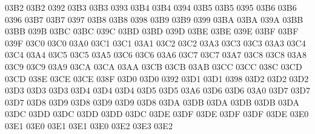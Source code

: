 \setcclcucx 03B2 03B2 0392 %
\setcclcucx 03B3 03B3 0393 %
\setcclcucx 03B4 03B4 0394 %
\setcclcucx 03B5 03B5 0395 %
\setcclcucx 03B6 03B6 0396 %
\setcclcucx 03B7 03B7 0397 %
\setcclcucx 03B8 03B8 0398 %
\setcclcucx 03B9 03B9 0399 %
\setcclcucx 03BA 03BA 039A %
\setcclcucx 03BB 03BB 039B %
\setcclcucx 03BC 03BC 039C %
\setcclcucx 03BD 03BD 039D %
\setcclcucx 03BE 03BE 039E %
\setcclcucx 03BF 03BF 039F %
\setcclcucx 03C0 03C0 03A0 %
\setcclcucx 03C1 03C1 03A1 %
\setcclcucx 03C2 03C2 03A3 %
\setcclcucx 03C3 03C3 03A3 %
\setcclcucx 03C4 03C4 03A4 %
\setcclcucx 03C5 03C5 03A5 %
\setcclcucx 03C6 03C6 03A6 %
\setcclcucx 03C7 03C7 03A7 %
\setcclcucx 03C8 03C8 03A8 %
\setcclcucx 03C9 03C9 03A9 %
\setcclcucx 03CA 03CA 03AA %
\setcclcucx 03CB 03CB 03AB %
\setcclcucx 03CC 03CC 038C %
\setcclcucx 03CD 03CD 038E %
\setcclcucx 03CE 03CE 038F %
\setcclcucx 03D0 03D0 0392 %
\setcclcucx 03D1 03D1 0398 %
\setcclcucx 03D2 03D2 03D2 %
\setcclcucx 03D3 03D3 03D3 %
\setcclcucx 03D4 03D4 03D4 %
\setcclcucx 03D5 03D5 03A6 %
\setcclcucx 03D6 03D6 03A0 %
\setcclcucx 03D7 03D7 03D7 %
\setcclcucx 03D8 03D9 03D8 %
\setcclcucx 03D9 03D9 03D8 %
\setcclcucx 03DA 03DB 03DA %
\setcclcucx 03DB 03DB 03DA %
\setcclcucx 03DC 03DD 03DC %
\setcclcucx 03DD 03DD 03DC %
\setcclcucx 03DE 03DF 03DE %
\setcclcucx 03DF 03DF 03DE %
\setcclcucx 03E0 03E1 03E0 %
\setcclcucx 03E1 03E1 03E0 %
\setcclcucx 03E2 03E3 03E2 %
